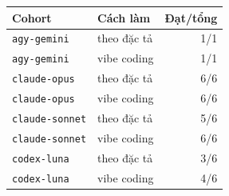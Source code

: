\begin{tabular}{llr}
\toprule
Cohort & Cách làm & Đạt/tổng \\
\midrule
\texttt{agy-gemini} & theo đặc tả & 1/1 \\
\texttt{agy-gemini} & vibe coding & 1/1 \\
\texttt{claude-opus} & theo đặc tả & 6/6 \\
\texttt{claude-opus} & vibe coding & 6/6 \\
\texttt{claude-sonnet} & theo đặc tả & 5/6 \\
\texttt{claude-sonnet} & vibe coding & 6/6 \\
\texttt{codex-luna} & theo đặc tả & 3/6 \\
\texttt{codex-luna} & vibe coding & 4/6 \\
\bottomrule
\end{tabular}
